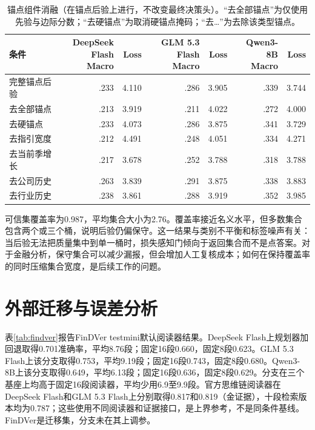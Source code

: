\begin{table}[H]
\centering
{}
\setlength{\tabcolsep}{2.5pt}
\caption{锚点组件消融（在锚点后验上进行，不改变最终决策头）。“去全部锚点”为仅使用先验与边际分数；“去硬锚点”为取消硬锚点掩码；“去…”为去除该类型锚点。}
\label{tab:ablation-anchors}
\begin{tabular}{lrrrrrr}
\toprule
条件 & \shortstack{DeepSeek\\Flash Macro} & Loss & \shortstack{GLM 5.3\\Flash Macro} & Loss & \shortstack{Qwen3-8B\\Macro} & Loss \\
\midrule
完整锚点后验 & .233 & 4.110 & .286 & 3.905 & .339 & 3.744 \\
去全部锚点 & .213 & 3.919 & .211 & 4.022 & .272 & 4.000 \\
去硬锚点 & .233 & 4.073 & .286 & 3.875 & .341 & 3.729 \\
去指引宽度 & .212 & 4.491 & .248 & 4.051 & .334 & 4.271 \\
去当前季增长 & .217 & 3.678 & .252 & 3.788 & .318 & 3.788 \\
去公司历史 & .263 & 3.839 & .291 & 3.875 & .338 & 3.883 \\
去行业历史 & .238 & 3.861 & .288 & 3.919 & .352 & 3.985 \\
\bottomrule
\end{tabular}
\end{table}

可信集覆盖率为0.987，平均集合大小为2.76。覆盖率接近名义水平，但多数集合包含两个或三个桶，说明后验仍偏保守。这一结果与类别不平衡和标签噪声有关：当后验无法把质量集中到单一桶时，损失感知门倾向于返回集合而不是点答案。对于金融分析，保守集合可以减少漏报，但会增加人工复核成本；如何在保持覆盖率的同时压缩集合宽度，是后续工作的问题。

\section{外部迁移与误差分析}

表\ref{tab:findver}报告FinDVer testmini默认阅读器结果。DeepSeek Flash上规划器加回退取得0.701准确率，平均8.76段；固定16段0.660，固定8段0.623。GLM 5.3 Flash上该分支取得0.753，平均9.19段；固定16段0.743，固定8段0.680。Qwen3-8B上该分支取得0.649，平均6.13段；固定16段0.636，固定8段0.629。分支在三个基座上均高于固定16段阅读器，平均少用6.9至9.9段。官方思维链阅读器在DeepSeek Flash和GLM 5.3 Flash上分别取得0.817和0.819（金证据），十段检索版本均为0.787；这些使用不同阅读器和证据接口，是上界参考，不是同条件基线。FinDVer是迁移集，分支未在其上调参。


